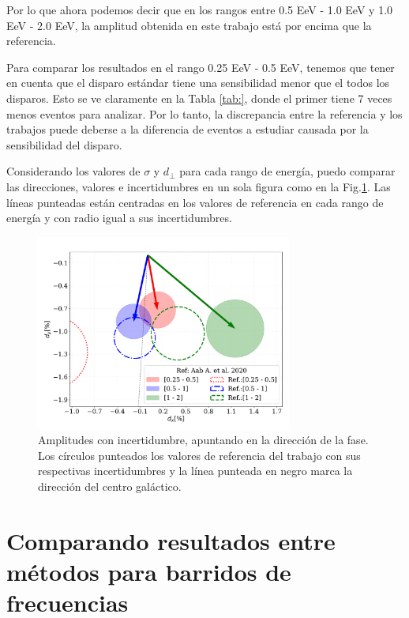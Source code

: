 \documentclass[11pt,papel,oneside,singlespace]{ibtesis}
\begin{document}
Por lo que ahora podemos decir que en los rangos entre 0.5 EeV - 1.0 EeV y 1.0 EeV - 2.0 EeV, la amplitud obtenida en este trabajo está por encima que la referencia. 

Para comparar los resultados en el  rango 0.25 EeV - 0.5 EeV, tenemos que tener en cuenta que el disparo estándar tiene una sensibilidad menor que el todos los disparos. Esto se ve claramente en la Tabla \ref{tab:}, donde el primer tiene 7 veces menos eventos para analizar. Por lo tanto, la discrepancia entre la referencia y los trabajos puede deberse a la  diferencia de eventos a estudiar causada por la sensibilidad del disparo.


Considerando los valores de $\sigma$ y $d_\perp$ para cada rango de energía, puedo comparar las direcciones, valores e incertidumbres en un sola figura como en la Fig.\ref{fig:incertidumbre}. Las líneas punteadas están centradas en los valores de referencia en cada rango de energía y con radio igual a sus incertidumbres. 

\begin{figure}[H]
    \begin{small}
        \begin{center}
            \includegraphics[width=0.75\textwidth]{comparando_sigmas_v2.pdf}
        \end{center}
        \caption{Amplitudes con incertidumbre, apuntando en la dirección  de la fase. Los círculos punteados los valores de referencia del trabajo \cite{Aab_2020} con sus respectivas incertidumbres y la línea punteada en negro marca la dirección del centro galáctico.}
        \label{fig:incertidumbre}
    \end{small}
\end{figure}


\section{Comparando resultados entre métodos para barridos de frecuencias}
\end{document}
